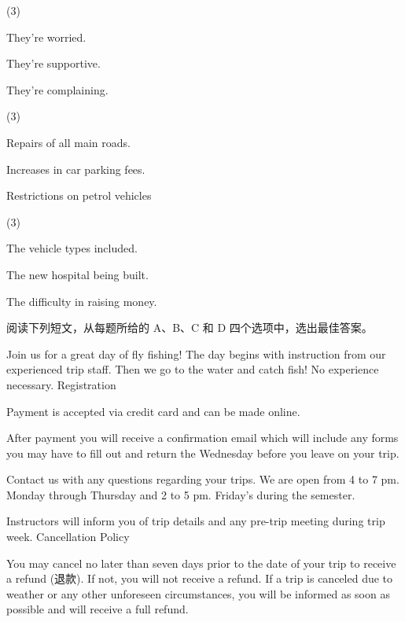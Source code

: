 \documentclass{英语试卷}
\begin{document}
\begin{choices}(3)
  \item They're worried.
  \item They're supportive.
  \item They're complaining.
\end{choices}
\begin{choices}(3)
  \item Repairs of all main roads.
  \item Increases in car parking fees.
  \item Restrictions on petrol vehicles
\end{choices}
\begin{choices}(3)
  \item The vehicle types included.
  \item The new hospital being built.
  \item The difficulty in raising money.
\end{choices}
\par 阅读下列短文，从每题所给的 A、B、C 和 D 四个选项中，选出最佳答案。\par
{}
\par Join us for a great day of fly fishing! The day begins with instruction from our experienced trip staff. Then we go to the water and catch fish! No experience necessary. Registration\par
\par Payment is accepted via credit card and can be made online.\par
\par After payment you will receive a confirmation email which will include any forms you may have to fill out and return the Wednesday before you leave on your trip.\par
\par Contact us with any questions regarding your trips. We are open from 4 to 7 pm. Monday through Thursday and 2 to 5 pm. Friday's during the semester.\par
\par Instructors will inform you of trip details and any pre-trip meeting during trip week. Cancellation Policy\par
\par You may cancel no later than seven days prior to the date of your trip to receive a refund (退款). If not, you will not receive a refund. If a trip is canceled due to weather or any other unforeseen circumstances, you will be informed as soon as possible and will receive a full refund.\par
\end{document}
